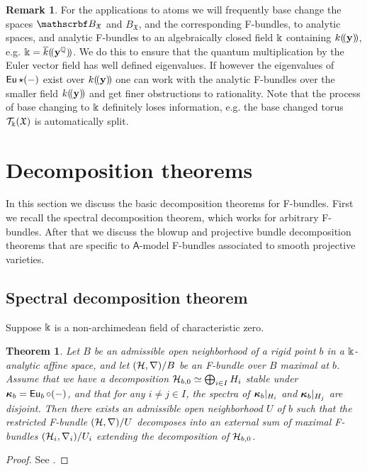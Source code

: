 \documentclass[twoside,leqno]{article}
\numberwithin{equation}{section}
\theoremstyle{plain}
\newtheorem{theorem}[equation]{Theorem}
\theoremstyle{definition}
\newtheorem{remark}[equation]{Remark}
\begin{document}
\begin{remark} \label{rem:basechange} For the applications to atoms we will
frequently base change the spaces $\omB_{\mathfrak{X}}$ and
$B_{\mathfrak{X}}$, and the corresponding F-bundles, to analytic
spaces, and analytic F-bundles to an algebraically closed field $\Bbbk$
containing $k(\!(\mathbf{y})\!)$, e.g.  $\Bbbk =
\overline{k}(\!(\mathbf{y}^{\mathbb Q})\!)$. We do this to ensure that the
quantum multiplication by the Euler vector field has well defined
eigenvalues. If however the eigenvalues of $\operatorname{\mathsf{Eu}}\star (-)$ exist over
$k(\!(\mathbf{y})\!)$ one can work with the analytic F-bundles over
the smaller field $k(\!(\mathbf{y})\!)$ and get finer obstructions to
rationality. Note that the process of base changing to $\Bbbk$
definitely loses information, e.g. the base changed torus
$\mathcal{T}_{\Bbbk}(\mathfrak{X})$ is automatically split.
\end{remark}







\section{Decomposition theorems} \label{sec:decompose}

In this section we discuss the basic decomposition theorems for F-bundles.
First we recall the spectral decomposition theorem, which works for arbitrary F-bundles. After that we discuss the blowup and projective bundle decomposition theorems that are specific to $\mathsf{A}$-model F-bundles associated to smooth projective varieties. 


\subsection{Spectral decomposition theorem} \label{ssec:specd} 


 Suppose $\Bbbk$ is a non-archimedean field of characteristic zero.

\begin{theorem} \label{thm:K-decomposition}
    Let $B$ be an admissible open neighborhood of a rigid point $b$ in a
    $\Bbbk$-analytic affine space, and let $(\mathcal H ,\nabla)/B$ be an
    F-bundle over $B$ maximal at $b$.  Assume that we have a
    decomposition $\mathcal H_{b,0} \simeq \bigoplus_{i\in I} H_i$ stable
    under $\boldsymbol{\kappa}_b = \operatorname{\mathsf{Eu}}_{b}\circ (-)$, and that for any $i\neq j\in
    I$, the spectra of $\boldsymbol{\kappa}_b\vert_{H_i}$ and $\boldsymbol{\kappa}_b\vert_{H_j}$
    are disjoint.  Then there exists an admissible open neighborhood
    $U$ of $b$ such that the restricted F-bundle $(\mathcal H,\nabla)/U$ decomposes
    into an external sum of maximal F-bundles $(\mathcal H_i ,\nabla_i ) /U_i$
    extending the decomposition of $\mathcal H_{b,0}$.
\end{theorem}
\begin{proof}
    See \cite[Theorem 1.2]{HYZZ_Decomposition}.
\end{proof}
\end{document}
